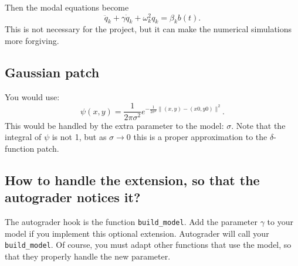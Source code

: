 \documentclass[11pt]{article}
\begin{document}
Then the modal equations become
\[
\ddot q_k + \gamma \dot q_k + \omega_k^2 q_k = \beta_k b(t).
\]
This is not necessary for the project, but it can make the numerical 
simulations more forgiving.

\subsection{ Gaussian patch}
You would use:
\[ \psi(x,y) = \frac{1}{2\pi\sigma^2} e^{-\frac{1}{2\sigma^2} \|(x,y)-(x0,y0)\|^2}. \]
This would be handled by the extra parameter to the model: \( \sigma \).
Note that the integral of \(\psi\) is not 1, but as \(\sigma\to 0\) this is
a proper approximation to the \(\delta\)-function patch.


\subsection{How to handle the extension, so that the autograder notices it?}
The autograder hook is the function \texttt{build\_model}. Add the
parameter \(\gamma\) to your model if you implement this optional extension.
Autograder will call your \texttt{build\_model}. Of course, you must
adapt other functions that use the model, so that they properly handle
the new parameter.
\end{document}
